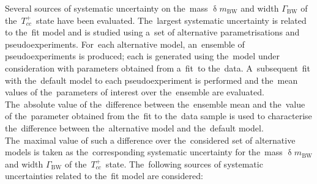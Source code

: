 \documentclass[12pt,a4paper]{article}
\def\PT      {\ensuremath{\mathrm{T}}\xspace}
\def\Pc      {\ensuremath{\mathrm{c}}\xspace}
\def\PT      {\ensuremath{T}\xspace}
\def\Pc      {\ensuremath{c}\xspace}
\def\cquark    {{\ensuremath{\Pc}}\xspace}
\def\Tcc {{{\ensuremath{\PT_{\cquark\cquark}^+}}}\xspace}
\begin{document}
Several sources of systematic uncertainty 
on the~mass $\updelta m_{\mathrm{BW}}$
and width $\Gamma_{\mathrm{BW}}$
of the~\Tcc~state 
have been evaluated. 
The~largest systematic uncertainty 
is related to the~fit model 
and is studied using a~set of alternative
parametrisations and pseudoexperiments.
For~each alternative model, 
an~ensemble of pseudoexperiments is produced;
each is generated using the~model under 
consideration
with parameters obtained from a~fit~to 
the~data.  
A~subsequent~fit with the~default
model to 
each pseudoexperiment is performed 
and the~mean values of 
the~parameters of interest over 
the~ensemble are evaluated.
The~absolute value of the~difference between 
the~ensemble mean 
and 
the~value of the~parameter obtained from 
the~fit to the~data sample is used to 
characterise the~difference
between the~alternative  model 
and the~default model. 
The~maximal value of such a difference 
over the~considered set of 
alternative models is taken 
as the~corresponding systematic uncertainty
for the~mass $\updelta m_{\mathrm{BW}}$
and width $\Gamma_{\mathrm{BW}}$
of the~\Tcc~state.
The~following sources of systematic uncertainties 
related to the~fit model are considered: 
\end{document}

